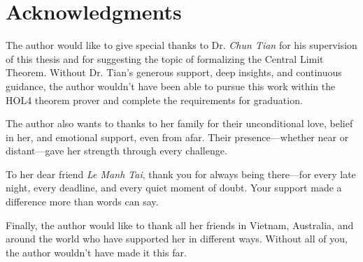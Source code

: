 \chapter*{Acknowledgments}
\label{ack}

The author would like to give special thanks to Dr. \emph{Chun Tian} for his supervision of this thesis and for suggesting the topic of formalizing the Central Limit Theorem. Without Dr. Tian’s generous support, deep insights, and continuous guidance, the author wouldn't have been able to pursue this work within the HOL4 theorem prover and complete the requirements for graduation.

The author also wants to thanks to her family for their unconditional love, belief in her, and emotional support, even from afar. Their presence—whether near or distant—gave her strength through every challenge.

To her dear friend \emph{Le Manh Tai}, thank you for always being there—for every late night, every deadline, and every quiet moment of doubt. Your support made a difference more than words can say.

Finally, the author would like to thank all her friends in Vietnam, Australia, and around the world who have supported her in different ways. Without all of you, the author wouldn’t have made it this far.
